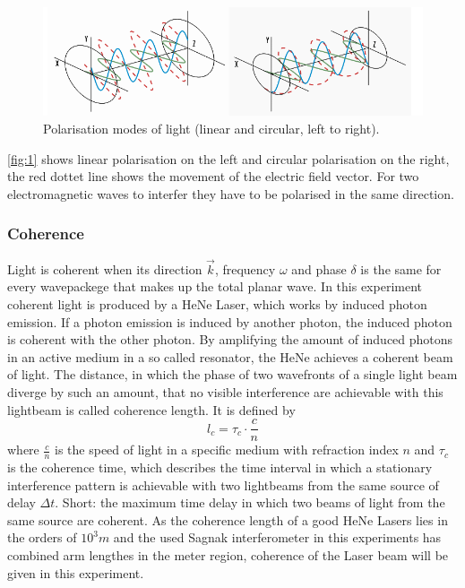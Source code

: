 \begin{figure}[H]
    \centering
    \includegraphics[width=.8\linewidth]{polar.pdf}
    \caption{Polarisation modes of light (linear and circular, left to right). \cite{polarisation}}
    \label{fig:1}
\end{figure}
\noindent
\autoref{fig:1} shows linear polarisation on the left and circular polarisation on the right, the red dottet line shows the movement of the electric field vector. 
For two electromagnetic waves to interfer they have to be polarised in the same direction. 
\subsubsection{Coherence}
Light is coherent when its direction $\vec{k}$, frequency $\omega$ and phase $\delta$ is the same for every wavepackege that makes up the total planar wave. In this experiment coherent light is produced by a HeNe Laser, which works by induced photon emission. If a photon emission is induced by another photon, the induced photon is coherent with the other photon. By 
amplifying the amount of induced photons in an active medium in a so called resonator, the HeNe achieves a coherent beam of light. The distance, in which the phase of two wavefronts of a single light beam diverge by such an amount, that no visible interference are achievable with this lightbeam is called coherence length. It is defined by 
\begin{equation}
    l_c = \tau_c \cdot \frac{c}{n}
\end{equation}
where $\frac{c}{n}$ is the speed of light in a specific medium with refraction index $n$ and $\tau_c$ is the coherence time, which describes the time interval in which a stationary interference pattern is achievable with two lightbeams from the same source of delay $\Delta t$. Short: the maximum time delay in which two beams of light from the same source are coherent. 
As the coherence length of a good HeNe Lasers lies in the orders of $10^3 m$ and the used Sagnak interferometer in this experiments has combined arm lengthes in the meter region, coherence of the Laser beam will be given in this experiment.
